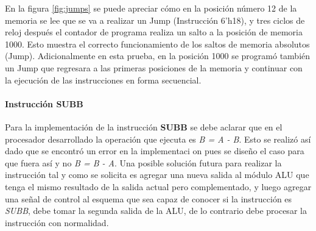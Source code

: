 En la figura \ref{fig:jumps} se puede apreciar c\' omo en la posici\' on n\' umero 12 de la memoria se lee que se va a realizar un Jump (Instrucción 6'h18), y tres ciclos de reloj despu\' es el contador de programa realiza un salto a la posici\'on de memoria 1000. Esto muestra el correcto funcionamiento de los saltos de memoria absolutos (Jump). Adicionalmente en esta prueba, en la posici\' on 1000 se program\' o tambi\' en un Jump que regresara a las primeras posiciones de la memoria y continuar con la ejecuci\' on de las instrucciones en forma secuencial.

\paragraph{Instrucci\' on \textbf{SUBB}}
Para la implementaci\' on de la instrucci\' on \textbf{SUBB} se debe aclarar que en el procesador desarrollado la operaci\' on que ejecuta es \textit{B = A - B}. Esto se realiz\' o as\' i dado que se encontr\' o un error en la implementaci\; on pues se dise\~ no el caso para que fuera as\' i y no \textit{B = B - A}. Una posible soluci\' on futura para realizar la instrucci\' on tal y como se solicita es agregar una nueva salida al m\' odulo ALU que tenga el mismo resultado de la salida actual pero complementado, y luego agregar una se\~ nal de control al esquema que sea capaz de conocer si la instrucci\' on es \textit{SUBB}, debe tomar la segunda salida de la ALU, de lo contrario debe procesar la instrucci\' on con normalidad.




